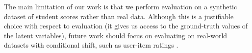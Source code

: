 \documentclass{article} %
\begin{document}
The main limitation of our work is that we perform evaluation on a synthetic dataset of student scores rather than real data. Although this is a justifiable choice with respect to evaluation (it gives us access to the ground-truth values of the latent variables), future work should focus on evaluating on real-world datasets with conditional shift, such as user-item ratings \citep{Koren2009MatrixFT}.




\end{document}
